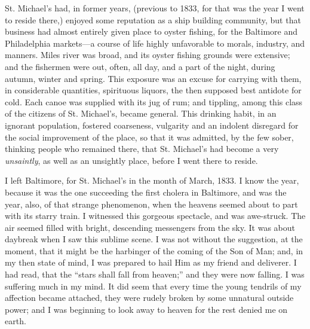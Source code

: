 St. Michael's had, in former years, (previous to 1833, for that was the
year I went to reside there,) enjoyed some reputation as a ship building
community, but that business had almost entirely given place to oyster
fishing, for the Baltimore and Philadelphia markets---a course of life
highly unfavorable to morals, {\protect\hypertarget{186}{}{}}industry,
and manners. Miles river was broad, and its oyster fishing grounds were
extensive; and the fishermen were out, often, all day, and a part of the
night, during autumn, winter and spring. This exposure was an excuse for
carrying with them, in considerable quantities, spirituous liquors, the
then supposed best antidote for cold. Each canoe was supplied with its
jug of rum; and tippling, among this class of the citizens of St.
Michael's, became general. This drinking habit, in an ignorant
population, fostered coarseness, vulgarity and an indolent disregard for
the social improvement of the place, so that it was admitted, by the few
sober, thinking people who remained there, that St. Michael's had become
a very \emph{unsaintly}, as well as an unsightly place, before I went
there to reside.

I left Baltimore, for St. Michael's in the month of March, 1833. I know
the year, because it was the one succeeding the first cholera in
Baltimore, and was the year, also, of that strange phenomenon, when the
heavens seemed about to part with its starry train. I witnessed this
gorgeous spectacle, and was awe-struck. The air seemed filled with
bright, descending messengers from the sky. It was about daybreak when I
saw this sublime scene. I was not without the suggestion, at the moment,
that it might be the harbinger of the coming of the Son of Man; and, in
my then state of mind, I was prepared to hail Him as my friend and
deliverer. I had read, that the ``stars shall fall from heaven;'' and
they were now falling. I was suffering much in my mind. It did seem that
every time the young tendrils of my affection became attached, they were
{\protect\hypertarget{187}{}{}}rudely broken by some unnatural outside
power; and I was beginning to look away to heaven for the rest denied me
on earth.

